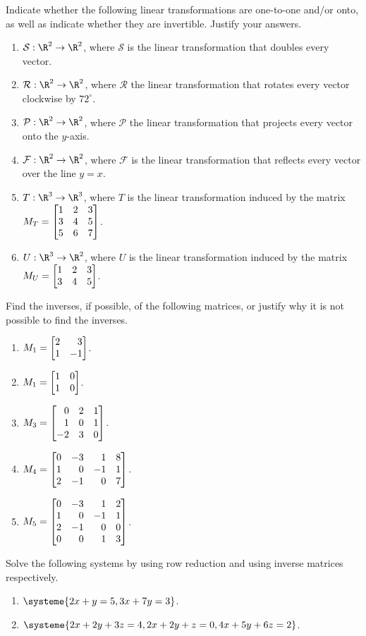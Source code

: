 \begin{exercises}
	\begin{problist}
		\prob  Indicate whether the following linear transformations are one-to-one and/or onto, as well as indicate whether they are invertible. Justify your answers.
		\begin{enumerate}
			\item   $\mathcal S:\R^2\to\R^2$, where $\mathcal S$ is the linear transformation that doubles every vector.
			\item   $\mathcal R:\R^2\to\R^2$, where $\mathcal R$ the linear transformation that rotates every vector clockwise by $72^\circ$.
			\item   $\mathcal P:\R^2\to\R^2$, where $\mathcal P$ the linear transformation that projects every vector onto the $y$-axis.
			\item   $\mathcal F:\R^2\to\R^2$, where $\mathcal F$ is the linear transformation that reflects every vector over the line $y=x$.
			\item   $T:\R^3\to\R^3$, where $T$ is the linear transformation induced by the matrix $M_T = \mat{1&2&3\\3&4&5\\5&6&7}$.
			\item   $U:\R^3\to\R^2$, where $U$ is the linear transformation induced by the matrix $M_U = \mat{1&2&3\\3&4&5}$.
		\end{enumerate}
		
		\prob Find the inverses, if possible, of the following matrices, or justify why it is not possible to find the inverses.
		    \begin{enumerate}
		        \item   $M_1 = \mat{2&3\\1&-1}$.
		        \item   $M_1 = \mat{1&0\\1&0}$.
		        \item   $M_3 = \mat{0&2&1\\1&0&1\\-2&3&0}$.
		        \item   $M_4 = \mat{0&-3&1&8\\1&0&-1&1\\2&-1&0&7}$.
		        \item   $M_5 = \mat{0&-3&1&2\\1&0&-1&1\\2&-1&0&0\\0&0&1&3}$.
		    \end{enumerate}
		\prob Solve the following systems by using row reduction and using inverse matrices respectively. 
		    \begin{enumerate}
		        \item   $\systeme{2x+y=5,3x+7y=3}$.
		        \item   $\systeme{2x+2y+3z=4,2x+2y+z=0, 4x+5y+6z=2}$.
		    \end{enumerate}
		    

\end{problist}
\end{exercises}
